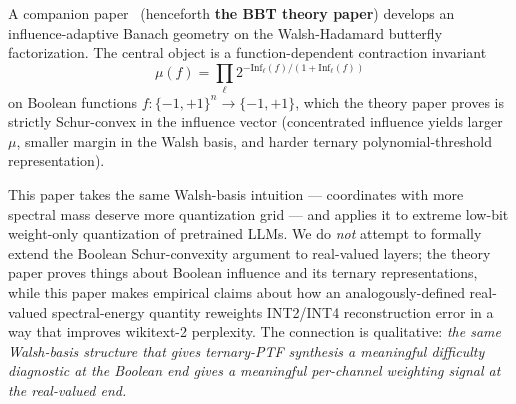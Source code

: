 \documentclass[11pt]{article}
\newcommand{\Inf}{\mathrm{Inf}}
\begin{document}
A companion paper~\cite{bbtTheoryCompanion} (henceforth \textbf{the BBT theory paper}) develops an influence-adaptive Banach geometry on the Walsh-Hadamard butterfly factorization. The central object is a function-dependent contraction invariant
\[
\mu(f) = \prod_\ell 2^{-\Inf_\ell(f)/(1 + \Inf_\ell(f))}
\]
on Boolean functions $f:\{-1,+1\}^n \to \{-1,+1\}$, which the theory paper proves is strictly Schur-convex in the influence vector (concentrated influence yields larger $\mu$, smaller margin in the Walsh basis, and harder ternary polynomial-threshold representation).

This paper takes the same Walsh-basis intuition --- coordinates with more spectral mass deserve more quantization grid --- and applies it to extreme low-bit weight-only quantization of pretrained LLMs. We do \emph{not} attempt to formally extend the Boolean Schur-convexity argument to real-valued layers; the theory paper proves things about Boolean influence and its ternary representations, while this paper makes empirical claims about how an analogously-defined real-valued spectral-energy quantity reweights INT2/INT4 reconstruction error in a way that improves wikitext-2 perplexity. The connection is qualitative: \emph{the same Walsh-basis structure that gives ternary-PTF synthesis a meaningful difficulty diagnostic at the Boolean end gives a meaningful per-channel weighting signal at the real-valued end.}
\end{document}
